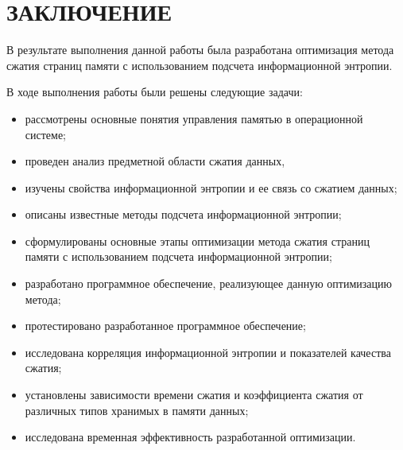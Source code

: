 \chapter*{ЗАКЛЮЧЕНИЕ}

В результате выполнения данной работы была разработана оптимизация метода сжатия страниц памяти с использованием подсчета информационной энтропии.

В ходе выполнения работы были решены следующие задачи:

\begin{itemize}
	\item рассмотрены основные понятия управления памятью в операционной системе;
	\item проведен анализ предметной области сжатия данных, 
	\item изучены свойства информационной энтропии и ее связь со сжатием данных;
	\item описаны известные методы подсчета информационной энтропии;
	\item сформулированы основные этапы оптимизации метода сжатия страниц памяти с использованием подсчета информационной энтропии;
    \item разработано программное обеспечение, реализующее данную оптимизацию метода;
    \item протестировано разработанное программное обеспечение;
    \item исследована корреляция информационной энтропии и показателей качества сжатия;
	\item установлены зависимости времени сжатия и коэффициента сжатия от различных типов хранимых в памяти данных;
    \item исследована временная эффективность разработанной оптимизации.
\end{itemize}